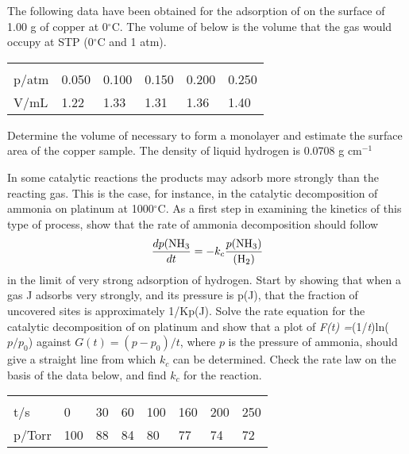 \documentclass[a4paper,12pt,titlepage]{article}
\begin{document}
\begin{ExerciseList}
\Exercise The following data have been obtained for the adsorption of  on the surface of 1.00 g of copper at 0\(^\circ\)C. The volume of  below is the volume that the gas would occupy at STP (0\(^\circ\)C and 1 atm).

\begin{tabular}{llllll}
\hline\\p/atm & 0.050 & 0.100 & 0.150 & 0.200 & 0.250 \\
V/mL & 1.22 & 1.33 & 1.31 & 1.36 & 1.40 \\\hline
\end{tabular}

Determine the volume of  necessary to form a monolayer and estimate the surface area of the copper sample. The density of liquid hydrogen is 0.0708 g cm\(^{-1}\)

\Exercise In some catalytic reactions the products may adsorb more strongly than the reacting gas. This is the case, for instance, in the catalytic decomposition of ammonia on platinum at 1000\(^\circ\)C. As a first step in examining the kinetics of this type of process, show that the rate of ammonia decomposition should follow
\[\frac{dp(\ce{NH3}}{dt} = -k_c \frac{p(\ce{NH3})}{(\ce{H2})}\]
in the limit of very strong adsorption of hydrogen. Start by showing that when a gas J adsorbs very strongly, and its pressure is p(J), that the fraction of uncovered sites is approximately 1/Kp(J). Solve the rate equation for the catalytic decomposition of  on platinum and show that a plot of \textit{F(t) =}(1/\textit{t})ln(\(p/p_0\)) against \(G(t) = (p - p_0)/t\), where \(p\) is the pressure of ammonia, should give a straight line from which \(k_c\) can be determined. Check the rate law on the basis of the data below, and find \(k_c\) for the reaction.

\begin{tabular}{llllllll}
\hline\\t/s & 0 & 30 & 60 & 100 & 160 & 200 & 250\\
p/Torr & 100 & 88 & 84 & 80 & 77 & 74 & 72\\\hline
\end{tabular}



\end{ExerciseList}
\end{document}
